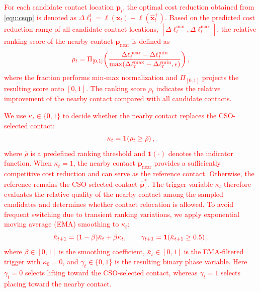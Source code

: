 \textcolor{red}{
For each candidate contact location $\boldsymbol{p}_i$, the optimal cost reduction obtained from \eqref{equ:csqp} is denoted as
$\Delta \ell_t^i
=\ell(\boldsymbol{x}_t)-\ell(\hat{\boldsymbol{x}}_t^+)$.
Based on the predicted cost reduction range of all candidate contact locations, $\left[\Delta\ell_t^{\mathrm{min}},\Delta\ell_t^{\mathrm{max}}\right]$, the relative ranking score of the nearby contact $\boldsymbol{p}_{\mathrm{near}}$ is defined as
}
\begin{equation}\label{equ:ranking1}
\textcolor{red}{
\rho_t=
\Pi_{[0,1]}\!\left(
\frac{
\Delta\ell_t^{\mathrm{near}}
-\Delta\ell_t^{\mathrm{min}}
}{\max(
\Delta\ell_t^{\mathrm{max}}
-\Delta\ell_t^{\mathrm{min}}, \epsilon)
}
\right),
}
\end{equation}
\noindent\textcolor{red}{
where the fraction performs min-max normalization and $\Pi_{[0,1]}$ projects the resulting score onto $[0,1]$.
The ranking score $\rho_t$ indicates the relative improvement of the
nearby contact compared with all candidate contacts.
}

\textcolor{red}{
We use $\kappa_t\in\{0,1\}$ to decide whether the nearby contact replaces the
CSO-selected contact:
}
\begin{equation}\label{equ:kappa}
\textcolor{red}{
\kappa_t=\mathbf{1}\!\left(\rho_t\geq\bar{\rho}\right),
}
\end{equation}
\noindent\textcolor{red}{
where $\bar{\rho}$ is a predefined ranking threshold and
$\mathbf{1}(\cdot)$ denotes the indicator function.
When $\kappa_t=1$, the nearby contact
$\boldsymbol{p}_{\mathrm{near}}$ provides a sufficiently competitive
cost reduction and can serve as \textcolor{red}{the} reference contact.
Otherwise, the reference remains the CSO-selected contact
$\hat{\boldsymbol{p}}_{\mathrm r}^{*}$.
The trigger variable $\kappa_t$ therefore evaluates the \textcolor{red}{relative quality} of
the nearby contact \textcolor{red}{among the sampled candidates} and determines whether contact relocation is allowed.
}
\textcolor{red}{
To avoid frequent switching due to transient ranking variations, we apply exponential moving average (EMA) smoothing to $\kappa_t$:
}
\begin{equation}\label{equ:ranking}
\textcolor{red}{
\bar{\kappa}_{t+1}=(1-\beta)\bar{\kappa}_t+\beta\kappa_t,
\qquad
\gamma_{t+1}=\mathbf{1}\!\left(\bar{\kappa}_{t+1}\geq\textcolor{red}{0.5}\right),
}
\end{equation}
\noindent\textcolor{red}{where $\beta\in[0,1]$ is the smoothing coefficient, $\bar{\kappa}_t\in[0,1]$ is the EMA-filtered trigger with $\bar{\kappa}_0=0$, and $\gamma_t\in\{0,1\}$ is the resulting binary phase variable. Here $\gamma_t=0$ selects lifting toward the CSO-selected contact, whereas $\gamma_t=1$ selects placing toward the nearby contact.}

